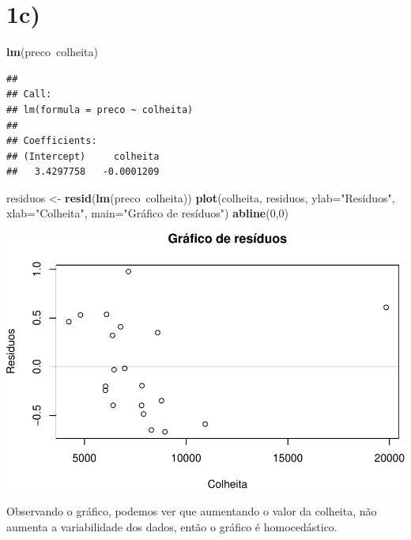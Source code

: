 \documentclass[11pt,]{article}
\makeatletter
\newenvironment{Shaded}{\begin{snugshade}}{\end{snugshade}}
\newcommand{\KeywordTok}[1]{\textcolor[rgb]{0.13,0.29,0.53}{\textbf{{#1}}}}
\newcommand{\DataTypeTok}[1]{\textcolor[rgb]{0.13,0.29,0.53}{{#1}}}
\newcommand{\DecValTok}[1]{\textcolor[rgb]{0.00,0.00,0.81}{{#1}}}
\newcommand{\StringTok}[1]{\textcolor[rgb]{0.31,0.60,0.02}{{#1}}}
\newcommand{\NormalTok}[1]{{#1}}
\def\maxwidth{\ifdim\Gin@nat@width>\linewidth\linewidth
\else\Gin@nat@width\fi}
\let\Oldincludegraphics\includegraphics
\renewcommand{\includegraphics}[1]{\Oldincludegraphics[width=\maxwidth]{#1}}
\makeatother
\begin{document}
\section{1c)}\label{c}

\begin{Shaded}
\begin{Highlighting}[]
\KeywordTok{lm}\NormalTok{(preco~colheita)}
\end{Highlighting}
\end{Shaded}

\begin{verbatim}
## 
## Call:
## lm(formula = preco ~ colheita)
## 
## Coefficients:
## (Intercept)     colheita  
##   3.4297758   -0.0001209
\end{verbatim}

\begin{Shaded}
\begin{Highlighting}[]
\NormalTok{residuos <-}\StringTok{ }\KeywordTok{resid}\NormalTok{(}\KeywordTok{lm}\NormalTok{(preco~colheita))}
\KeywordTok{plot}\NormalTok{(colheita, residuos,}
     \DataTypeTok{ylab=}\StringTok{"Residuos"}\NormalTok{,}
     \DataTypeTok{xlab=}\StringTok{"Colheita"}\NormalTok{,}
     \DataTypeTok{main=}\StringTok{"Gráfico de resíduos"}\NormalTok{) }
\KeywordTok{abline}\NormalTok{(}\DecValTok{0}\NormalTok{,}\DecValTok{0}\NormalTok{)}
\end{Highlighting}
\end{Shaded}

\includegraphics{versaofinal_lista3_files/figure-latex/unnamed-chunk-4-1.pdf}

Observando o gráfico, podemos ver que aumentando o valor da colheita,
não aumenta a variabilidade dos dados, então o gráfico é homocedástico.
\end{document}
